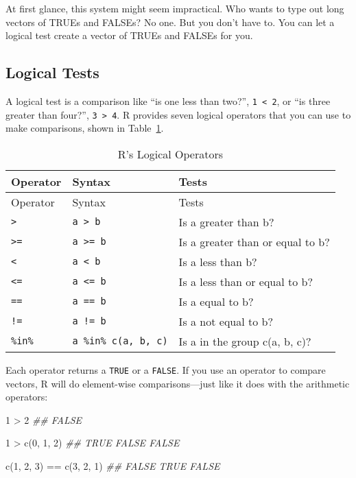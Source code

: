 \documentclass[
  letterpaper,
  DIV=11,
  numbers=noendperiod]{scrbook}
\newenvironment{Shaded}{\begin{snugshade}}{\end{snugshade}}
\newcommand{\DecValTok}[1]{\textcolor[rgb]{0.68,0.00,0.00}{#1}}
\newcommand{\DocumentationTok}[1]{\textcolor[rgb]{0.37,0.37,0.37}{\textit{#1}}}
\newcommand{\FunctionTok}[1]{\textcolor[rgb]{0.28,0.35,0.67}{#1}}
\newcommand{\NormalTok}[1]{\textcolor[rgb]{0.00,0.23,0.31}{#1}}
\newcommand{\SpecialCharTok}[1]{\textcolor[rgb]{0.37,0.37,0.37}{#1}}
\begin{document}
At first glance, this system might seem impractical. Who wants to type
out long vectors of TRUEs and FALSEs? No one. But you don't have to. You
can let a logical test create a vector of TRUEs and FALSEs for you.

\subsection{Logical Tests}\label{logical-tests}

A logical test is a comparison like ``is one less than two?'',
\texttt{1\ \textless{}\ 2}, or ``is three greater than four?'',
\texttt{3\ \textgreater{}\ 4}. R provides seven logical operators that
you can use to make comparisons, shown in Table~\ref{tbl-logop}.

\begin{longtable}[]{@{}lll@{}}
\caption{R's Logical Operators}\label{tbl-logop}\tabularnewline
\toprule\noalign{}
Operator & Syntax & Tests \\
\midrule\noalign{}
\endfirsthead
\toprule\noalign{}
Operator & Syntax & Tests \\
\midrule\noalign{}
\endhead
\bottomrule\noalign{}
\endlastfoot
\texttt{\textgreater{}} & \texttt{a\ \textgreater{}\ b} & Is a greater
than b? \\
\texttt{\textgreater{}=} & \texttt{a\ \textgreater{}=\ b} & Is a greater
than or equal to b? \\
\texttt{\textless{}} & \texttt{a\ \textless{}\ b} & Is a less than b? \\
\texttt{\textless{}=} & \texttt{a\ \textless{}=\ b} & Is a less than or
equal to b? \\
\texttt{==} & \texttt{a\ ==\ b} & Is a equal to b? \\
\texttt{!=} & \texttt{a\ !=\ b} & Is a not equal to b? \\
\texttt{\%in\%} & \texttt{a\ \%in\%\ c(a,\ b,\ c)} & Is a in the group
c(a, b, c)? \\
\end{longtable}

Each operator returns a \texttt{TRUE} or a \texttt{FALSE}. If you use an
operator to compare vectors, R will do element-wise comparisons---just
like it does with the arithmetic operators:

\begin{Shaded}
\begin{Highlighting}[]
\DecValTok{1} \SpecialCharTok{\textgreater{}} \DecValTok{2}
\DocumentationTok{\#\# FALSE}

\DecValTok{1} \SpecialCharTok{\textgreater{}} \FunctionTok{c}\NormalTok{(}\DecValTok{0}\NormalTok{, }\DecValTok{1}\NormalTok{, }\DecValTok{2}\NormalTok{)}
\DocumentationTok{\#\# TRUE FALSE FALSE}

\FunctionTok{c}\NormalTok{(}\DecValTok{1}\NormalTok{, }\DecValTok{2}\NormalTok{, }\DecValTok{3}\NormalTok{) }\SpecialCharTok{==} \FunctionTok{c}\NormalTok{(}\DecValTok{3}\NormalTok{, }\DecValTok{2}\NormalTok{, }\DecValTok{1}\NormalTok{)}
\DocumentationTok{\#\# FALSE  TRUE FALSE}
\end{Highlighting}
\end{Shaded}
\end{document}
